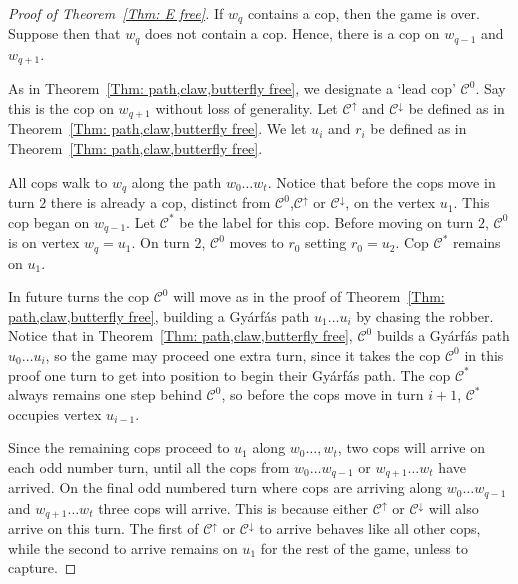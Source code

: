 \documentclass[12pt]{article}
\theoremstyle{definition}
\begin{document}
\begin{proof}[Proof of Theorem~\ref{Thm: E free}]
If $w_q$ contains a cop, then the game is over.
Suppose then that $w_q$ does not contain a cop.
Hence, there is a cop on $w_{q-1}$ and $w_{q+1}$.


As in Theorem~\ref{Thm: path,claw,butterfly free}, we designate a `lead cop' $\mathcal{C}^0$. 
Say this is the cop on $w_{q+1}$ without loss of generality.
Let $\mathcal{C}^\uparrow$ and $\mathcal{C}^\downarrow$ be defined as in Theorem~\ref{Thm: path,claw,butterfly free}.
We let $u_i$ and $r_i$ be defined as in Theorem~\ref{Thm: path,claw,butterfly free}.

All cops walk to $w_q$ along the path $w_0\dots w_t$.
Notice that before the cops move in turn $2$ there is already a cop,
distinct from $\mathcal{C}^0$,$\mathcal{C}^\uparrow$ or $\mathcal{C}^\downarrow$, on the vertex $u_1$.
This cop began on $w_{q-1}$.
Let $\mathcal{C^*}$ be the label for this cop.
Before moving on turn $2$, $\mathcal{C}^0$ is on vertex $w_q = u_1$.
On turn $2$, $\mathcal{C}^0$ moves to $r_0$ setting $r_0 = u_2$.
Cop $\mathcal{C^*}$ remains on $u_1$.


In future turns the cop $\mathcal{C}^0$ will move as in the proof of Theorem~\ref{Thm: path,claw,butterfly free},
building a Gy\'arf\'as path $u_1\dots u_i$ by chasing the robber.
Notice that in Theorem~\ref{Thm: path,claw,butterfly free}, $\mathcal{C}^0$ builds a Gy\'arf\'as path $u_0\dots u_i$,
so the game may proceed one extra turn, since it takes the cop $\mathcal{C}^0$ in this proof one turn to get into position to begin their Gy\'arf\'as path.
The cop $\mathcal{C}^*$ always remains one step behind $\mathcal{C}^0$, 
so before the cops move in turn $i+1$, $\mathcal{C}^*$ occupies vertex $u_{i-1}$.


Since the remaining cops proceed to $u_1$ along $w_0\dots, w_t$,
two cops will arrive on each odd number turn,
until all the cops from $w_0\dots w_{q-1}$ or $w_{q+1}\dots w_{t}$
have arrived.
On the final odd numbered turn where cops are arriving along $w_0\dots w_{q-1}$ and $w_{q+1}\dots w_{t}$
three cops will arrive.
This is because either $\mathcal{C}^\uparrow$ or $\mathcal{C}^\downarrow$
will also arrive on this turn.
The first of $\mathcal{C}^\uparrow$ or $\mathcal{C}^\downarrow$ to arrive behaves like all other cops,
while the second to arrive remains on $u_1$ for the rest of the game, unless to capture.



\end{proof}
\end{document}
